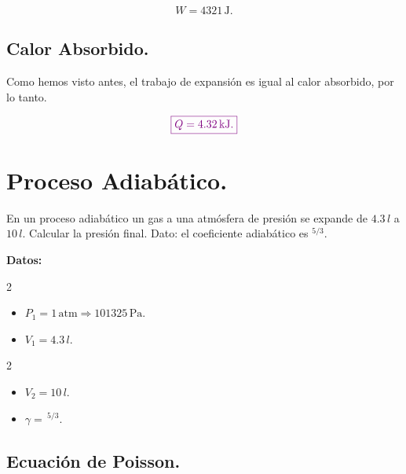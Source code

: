 \documentclass[a4paper,12pt]{article} %
\begin{document}
\[ W = 4321 \, \mathrm{J}. \]

\vspace{\baselineskip}

\subsection{Calor Absorbido.}

\begin{justify}
    Como hemos visto antes, el trabajo de expansión es igual al calor absorbido, por lo tanto.
\end{justify}

\[ \textcolor{violet}{\boxed{ Q = 4.32 \, \mathrm{kJ}. }} \]

\vspace{\baselineskip}

\section{Proceso Adiabático.}

\begin{justify}
    En un proceso adiabático un gas a una atmósfera de presión se expande de \( 4.3 \, l \) a \( 10 \, l\). Calcular la presión final. Dato: el coeficiente adiabático es \(^{5/3}\).
\end{justify}

\begin{justify}
    \textbf{Datos:}
\end{justify}

\begin{multicols}{2}
    \begin{itemize}
        \item \( P_1 = 1 \, \mathrm{atm} \Rightarrow 101325 \, \mathrm{Pa}. \)
        \item \( V_1 = 4.3 \, l. \)
    \end{itemize}
\end{multicols}

\begin{multicols}{2}
    \begin{itemize}
        \item \( V_2 = 10 \, l. \)
        \item \( \gamma = \, ^{5/3}. \)
    \end{itemize}
\end{multicols}

\vspace{\baselineskip}

\subsection{Ecuación  de Poisson.}
\end{document}
